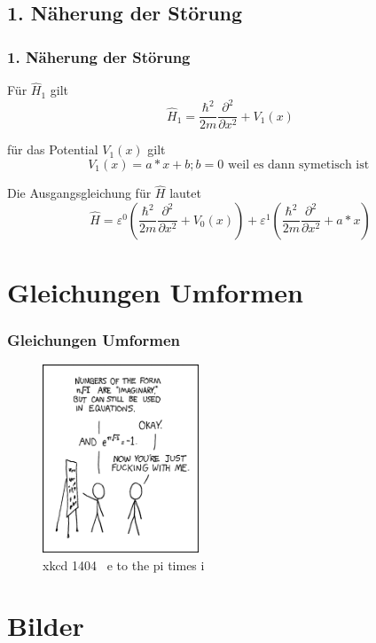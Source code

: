 \documentclass[aspectratio=169]{beamer}
\begin{document}
\subsection{ 1. N\"aherung der St\"orung }
\begin{frame} 
  \frametitle{ 1. N\"aherung der St\"orung }

  F\"ur $\hat H_1$ gilt
  \[
    \hat H_1 = \frac{\hbar^2}{2m} \frac{\partial^2}{\partial x^2} + V_1(x)
  \]

  f\"ur das Potential $V_1(x)$ gilt
  \[
    V_1(x) = a*x +b ; b = 0 \text{ weil es dann symetisch ist }
  \]

  Die Ausgangsgleichung f\"ur $\hat{H}$ lautet
  \[
    \hat{H} = \varepsilon^0 ( \frac{\hbar^2}{2m} \frac{\partial^2}{\partial x^2} + V_0(x) )
	      + \varepsilon^1 ( \frac{\hbar^2}{2m} \frac{\partial^2}{\partial x^2} + a*x )
  \]
\end{frame}


\section{ Gleichungen Umformen }
\begin{frame}
  \frametitle{ Gleichungen Umformen }
  \begin{figure}
    \centering
    \includegraphics[height=5.6cm]{./179_e_to_the_pi_times_i.png}
    \caption{ xkcd 1404 \textendash \ e to the pi times i }
    \label{abb:179_e_to_the_pi_times_i}
  \end{figure}
\end{frame}

\section{ Bilder }
\end{document}
